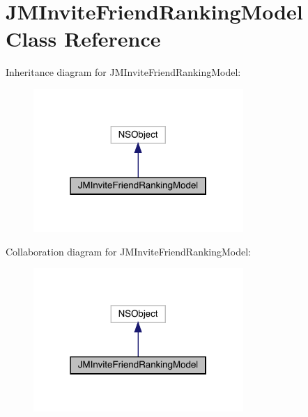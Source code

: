 \hypertarget{interface_j_m_invite_friend_ranking_model}{}\section{J\+M\+Invite\+Friend\+Ranking\+Model Class Reference}
\label{interface_j_m_invite_friend_ranking_model}


Inheritance diagram for J\+M\+Invite\+Friend\+Ranking\+Model\+:\nopagebreak
\begin{figure}[H]
\begin{center}
\leavevmode
\includegraphics[width=226pt]{interface_j_m_invite_friend_ranking_model__inherit__graph}
\end{center}
\end{figure}


Collaboration diagram for J\+M\+Invite\+Friend\+Ranking\+Model\+:\nopagebreak
\begin{figure}[H]
\begin{center}
\leavevmode
\includegraphics[width=226pt]{interface_j_m_invite_friend_ranking_model__coll__graph}
\end{center}
\end{figure}

